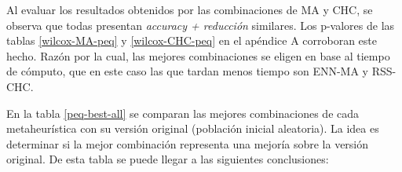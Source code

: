 Al evaluar los resultados obtenidos por las combinaciones de MA y CHC, se observa que todas presentan \emph{accuracy + reducción} similares. Los p-valores de las tablas \ref{wilcox-MA-peq} y \ref{wilcox-CHC-peq} en el apéndice A corroboran este hecho. Razón por la cual, las mejores combinaciones se eligen en base al tiempo de cómputo, que en este caso las que tardan menos tiempo son ENN-MA y RSS-CHC.


En la tabla \ref{peq-best-all} se comparan las mejores combinaciones de cada metaheurística con su versión original (población inicial aleatoria). La idea es determinar si la mejor combinación representa una mejoría sobre la versión original. De esta tabla se puede llegar a las siguientes conclusiones:

